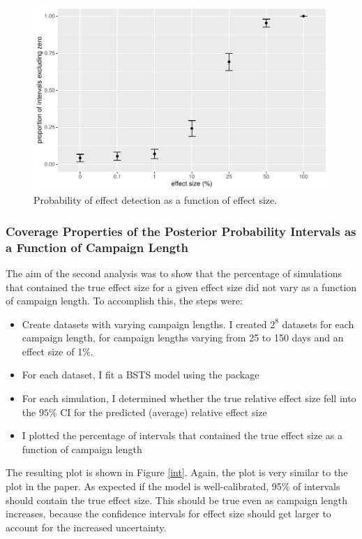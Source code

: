 \documentclass[12pt]{article}
\begin{document}
\begin{figure}[!h]
    \centering
    \includegraphics[scale=.6
    ]{../figures/finalsim.pdf}
    \caption{Probability of effect detection as a function of effect size.}
    \label{result}
\end{figure}


\subsubsection{Coverage Properties of the Posterior Probability Intervals as a Function of Campaign Length}
The aim of the second analysis was to show that the percentage of simulations that contained the true effect size for a given effect size did not vary as a function of campaign length. To accomplish this, the steps were:
\begin{itemize}
    \item Create datasets with varying campaign lengths. I created $2^8$ datasets for each campaign length, for campaign lengths varying from 25 to 150 days and an effect size of 1\%.
    \item For each dataset, I fit a BSTS model using the package
    \item For each simulation, I determined whether the true relative effect size fell into the $95\%$ CI for the predicted (average) relative effect size
    \item I plotted the percentage of intervals that contained the true effect size as a function of campaign length
\end{itemize}

The resulting plot is shown in Figure \ref{int}. Again, the plot is very similar to the plot in the paper. As expected if the model is well-calibrated, 95\% of intervals should contain the true effect size. This should be true even as campaign length increases, because the confidence intervals for effect size should get larger to account for the increased uncertainty.
\end{document}
